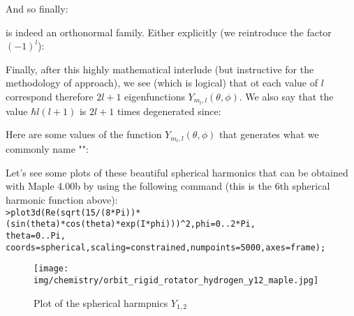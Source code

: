 	And so finally:
	
	is indeed an orthonormal family. Either explicitly (we reintroduce the factor $(-1)^l$):
	
	Finally, after this highly mathematical interlude (but instructive for the methodology of approach), we see (which is logical) that ot each value of $l$ correspond therefore $2l + 1$ eigenfunctions $Y_{m_l,l}(\theta,\phi)$. We also say that the value $\hbar l(l+1)$ is $2l + 1$ times degenerated since:
	
	Here are some values of the function  $Y_{m_l,l}(\theta,\phi)$ that generates what we commonly name "":
	
	Let's see some plots of these beautiful spherical harmonics that can be obtained with Maple 4.00b by using the following command (this is the $6$th spherical harmonic function above):\\

	\texttt{>plot3d(Re(sqrt(15/(8*Pi))*(sin(theta)*cos(theta)*exp(I*phi)))\string^2,phi=0..2*Pi,\\theta=0..Pi, coords=spherical,scaling=constrained,numpoints=5000,axes=frame);}
	\begin{figure}[H]
		\centering
		\texttt{[image: img/chemistry/orbit\_rigid\_rotator\_hydrogen\_y12\_maple.jpg]}	
		\caption{Plot of the spherical harmpnics $Y_{1,2}$}
	\end{figure}
	
